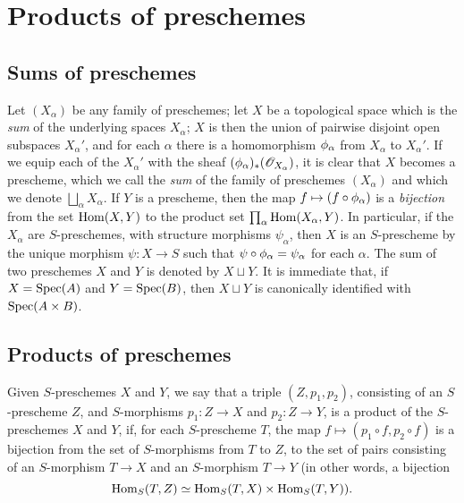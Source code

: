 \section{Products of preschemes}
\label{section:I.3}

\subsection{Sums of preschemes}
\label{subsection:I.3.1}

Let $(X_\alpha)$ be any family of preschemes; let $X$ be a topological space which is the
\emph{sum} of the underlying spaces $X_\alpha$; $X$ is then the union of pairwise
disjoint open subspaces $X_\alpha'$, and for each $\alpha$ there is a homomorphism
$\phi_\alpha$ from $X_\alpha$ to $X_\alpha'$. If we equip each of the $X_\alpha'$ with the
sheaf $(\phi_\alpha)_*(\mathscr{O}_{X_\alpha})$, it is clear that $X$ becomes a prescheme, which
we call the \emph{sum} of the family of preschemes $(X_\alpha)$ and which we denote
$\bigsqcup_\alpha X_\alpha$. If $Y$ is a prescheme, then the map $f\mapsto(f\circ\vphi_\alpha)$ is a
\emph{bijection} from the set $\operatorname{Hom}(X,Y)$ to the product set $\prod_\alpha\operatorname{Hom}(X_\alpha,Y)$.
In particular, if the $X_\alpha$ are $S$-preschemes, with structure morphisms $\psi_\alpha$, then $X$ is an $S$-prescheme by the unique morphism $\psi:X\to S$ such that
$\psi\circ\phi_\alpha=\psi_\alpha$ for each $\alpha$. The sum of two preschemes $X$ and $Y$ is denoted by $X\sqcup Y$.
It is immediate that, if $X=\operatorname{Spec}(A)$ and $Y=\operatorname{Spec}(B)$, then $X\sqcup Y$ is canonically identified with $\operatorname{Spec}(A\times B)$.

\subsection{Products of preschemes}
\label{subsection:I.3.2}

\begin{definition}[3.2.1]
\label{I.3.2.1}
Given $S$-preschemes $X$ and $Y$, we say that a triple $(Z,p_1,p_2)$, consisting of an
$S$-prescheme $Z$, and $S$-morphisms $p_1:Z\to X$ and $p_2:Z\to Y$, is a product of the
$S$-preschemes $X$ and $Y$, if, for each $S$-prescheme $T$, the map
$f\mapsto(p_1\circ f,p_2\circ f)$ is a bijection from the set of $S$-morphisms from $T$ to
$Z$, to the set of pairs consisting of an $S$-morphism $T\to X$ and an $S$-morphism $T\to Y$
(in other words, a bijection
\[
  \operatorname{Hom}_S(T,Z)\simeq\operatorname{Hom}_S(T,X)\times\operatorname{Hom}_S(T,Y)).
\]
\end{definition}

